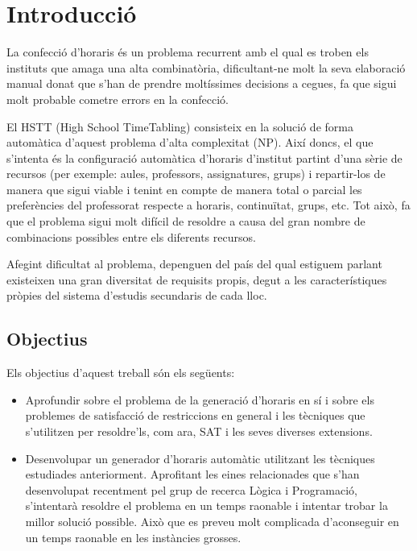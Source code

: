 \documentclass[11pt,a4paper,oneside]{article}
\begin{document}
  \begin{titlepage}
    
  \end{titlepage}

  
  \tableofcontents \newpage

  \section{Introducció}
  
  La confecció d'horaris és un problema recurrent amb el qual es troben els instituts que amaga una alta combinatòria, 
  dificultant-ne molt la seva elaboració manual donat que s'han de prendre moltíssimes decisions a cegues,
  fa que sigui molt probable cometre errors en la confecció.

  El HSTT (High School TimeTabling) consisteix en la solució de forma automàtica d'aquest problema d'alta complexitat (NP). 
  Així doncs, el que s'intenta és la configuració automàtica d'horaris d'institut partint d'una sèrie de recursos 
  (per exemple: aules, professors, assignatures, grups) i repartir-los de manera que sigui viable i tenint en compte 
  de manera total o parcial les preferències del professorat respecte a horaris, continuïtat, grups, etc. 
  Tot això, fa que el problema sigui molt difícil de resoldre a causa del gran nombre de combinacions possibles entre els diferents recursos.
  
  Afegint dificultat al problema, depenguen del país del qual estiguem parlant existeixen una gran diversitat de requisits propis, degut a les característiques pròpies del sistema d'estudis secundaris de cada lloc.



  \subsection{Objectius}
  Els objectius d'aquest treball són els següents:
  \begin{itemize}
    \item Aprofundir sobre el problema de la generació d'horaris en sí i sobre els problemes de satisfacció de restriccions en general i les tècniques que s'utilitzen per resoldre'ls, com ara, SAT i les seves diverses extensions.
    \item Desenvolupar un generador d'horaris automàtic utilitzant les tècniques estudiades anteriorment. 
    Aprofitant les eines relacionades que s'han desenvolupat recentment pel grup de recerca Lògica i Programació, 
    s'intentarà resoldre el problema en un temps raonable i intentar trobar la millor solució possible. 
    Això que es preveu molt complicada d'aconseguir en un temps raonable en les instàncies grosses.
    
  \end{itemize}
  
\end{document}
